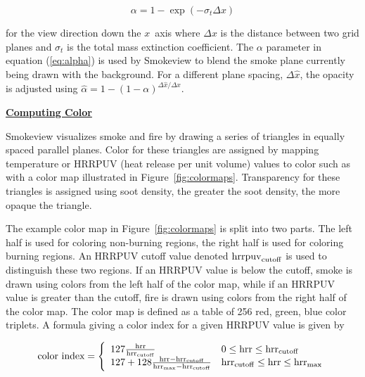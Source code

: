 \documentclass[11pt]{article}
\newcommand{\ssubsection}[1]{\underline{\bf #1}}
\begin{document}
\begin{equation}
\label{eq:alpha}
\alpha=1-\exp(-\sigma_t\Delta x)
\end{equation}

\noindent for the view direction down the $x$~axis
where $\Delta x$ is the distance between two grid planes and
$\sigma_t$ is the total mass extinction
coefficient.
The $\alpha$ parameter in equation (\ref{eq:alpha}) is used by Smokeview
to blend the smoke plane currently being drawn with the
background. For a different plane spacing, $\Delta \hat{x}$,
the opacity is adjusted using $\hat{\alpha}=1-(1-\alpha)^{\Delta \hat{x}/\Delta x}$.


\ssubsection{Computing Color}

Smokeview visualizes smoke and fire by drawing a series of triangles in equally spaced parallel planes.
Color for these triangles are assigned by mapping temperature or HRRPUV (heat release per unit volume)
values
to color such as with a color map illustrated in Figure~\ref{fig:colormaps}.
Transparency for these triangles is assigned using soot density, the greater the soot density,
the more opaque the triangle.

The example color map in Figure~\ref{fig:colormaps} is split into two parts.  The left half is used
for coloring non-burning regions, the right half is used for coloring burning regions.
An HRRPUV cutoff value denoted ${\rm hrrpuv}_{\rm cutoff}$ is used to
distinguish these two regions.
If an HRRPUV value is below the cutoff,
smoke is drawn using colors from the left half of the color map, while if an HRRPUV value is
greater than the cutoff,
fire is drawn using colors from the right half of the color map.  The color map is defined as a table
of 256 red, green, blue color triplets.  A formula giving a color index for a given HRRPUV value is given by

\newcommand{\hrr}{{\rm hrr}}
\newcommand{\hrrcutoff}{{\rm hrr}_{\rm cutoff}}
\newcommand{\hrrmax}{{\rm hrr}_{\rm max}}

\begin{eqnarray}
\mbox{color index}=\left\{
\begin{array}{ll}
  127\frac{\hrr}{\hrrcutoff} & 0 \le \hrr \le \hrrcutoff \\
  127 + 128\frac{\hrr-\hrrcutoff}{\hrrmax-\hrrcutoff} & \hrrcutoff \le \hrr \le \hrrmax
\end{array}
\right.
\end{eqnarray}
\end{document}
